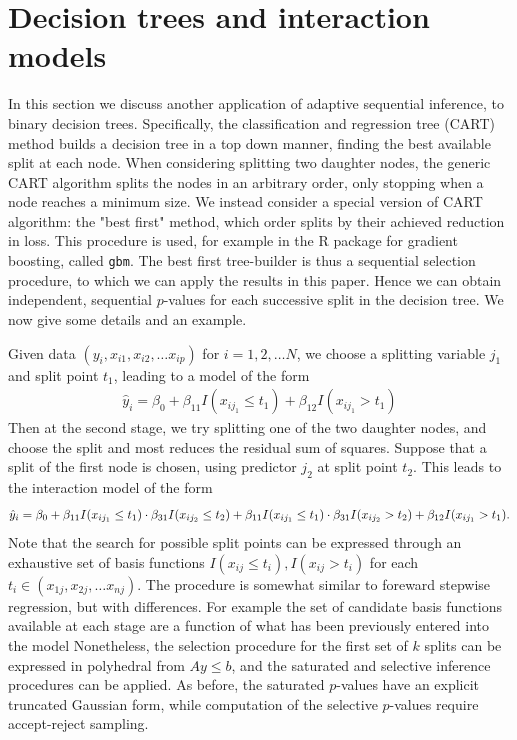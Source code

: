 \documentclass{article}
\begin{document}
\section{Decision trees and interaction models}
In this section we discuss another application of adaptive sequential inference, to binary decision trees.
Specifically, the classification and regression tree  (CART)  method builds a decision tree in a top down manner, finding the best available split
at each node.  When considering splitting two daughter nodes, the generic CART algorithm splits the nodes in an arbitrary order, only stopping when a node
reaches a minimum size.  We instead consider a  special version of CART  algorithm:  the   "best first"  method, which order splits by their achieved reduction in loss.
This procedure is used, for example in the R package for gradient boosting, called {\tt gbm}.
The best first tree-builder is thus a sequential selection  procedure,  to which we can apply the results in this paper. Hence we can obtain independent, sequential $p$-values
for each successive split in the decision  tree. We now give some details and an example.

Given data $(y_i, x_{i1}, x_{i2},\ldots x_{ip})$ for $i=1,2,\ldots N$,
we choose a splitting  variable $j_1$ and split point $t_1$, leading to a model of the form
\begin{eqnarray}
\hat y_i=\beta_0 +\beta_{11} I(x_{ij_1} \leq t_1) +\beta_{12} I(x_{ij_1} > t_1)
\end{eqnarray}
Then at the second stage, we try splitting one of the two daughter nodes, and choose the split and most reduces the residual sum of squares.
Suppose that a split of the first node is chosen, using predictor $j_2$ at split point $t_2$.  This leads to the interaction model of the form
\begin{eqnarray}
\hat y_i=\beta_0 +\beta_{11} I(x_{ij_1} \leq t_1) \cdot \beta_{31} I(x_{ij_2} \leq t_2)+   \beta_{11} I(x_{ij_1} \leq t_1) \cdot  \beta_{31} I(x_{ij_2} > t_2)  +\beta_{12} I(x_{ij_1} > t_1).\cr
\label{eqn:intmodel}
\end{eqnarray}
Note that the search for possible split points can be expressed through an exhaustive set of basis functions $I(x_{ij} \leq  t_i), I(x_{ij}  > t_i)$ for each $t_i \in (x_{1j}, x_{2j}, \ldots x_{nj})$.
The procedure is somewhat similar to foreward stepwise regression, but with differences.
For example the set of candidate basis functions available at each stage are a function of what has been  previously entered into the model
Nonetheless,  the selection procedure  for the first set of $k$ splits can be expressed in polyhedral from $Ay \leq b$, and the saturated and selective inference procedures can be applied.
As before, the saturated $p$-values have an explicit truncated Gaussian form, while computation of the selective $p$-values require accept-reject sampling.
\end{document}
